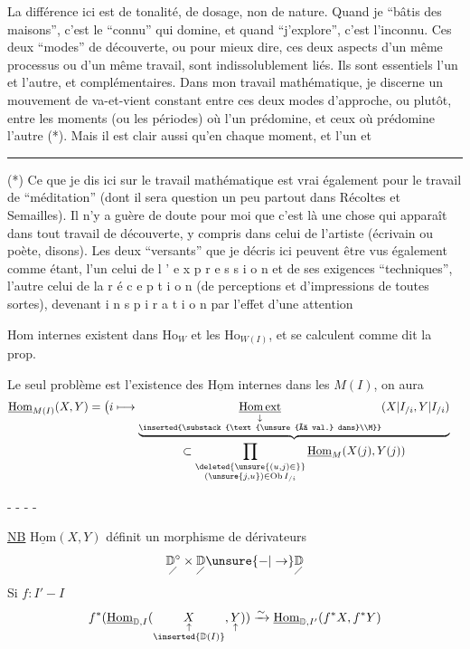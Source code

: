 La différence ici est de tonalité, de dosage, non de nature. Quand je ``bâtis des maisons'', c'est le ``connu'' qui domine, et quand ``j'explore'', c'est l'inconnu. Ces deux ``modes'' de découverte, ou pour mieux dire, ces deux aspects d'un même processus ou d'un même travail, sont indissolublement liés. Ils sont essentiels l'un et l'autre, et complémentaires. Dans mon travail mathématique, je discerne un mouvement de va-et-vient constant entre ces deux modes d'approche, ou plutôt, entre les moments (ou les périodes) où l'un prédomine, et ceux où prédomine l'autre (*). Mais il est clair aussi qu'en chaque moment, et l'un et

\noindent\rule{2.1cm}{0.4pt}

(*) Ce que je dis ici sur le travail mathématique est vrai également pour le travail de ``méditation'' (dont il sera question un peu partout dans Récoltes et Semailles). Il n'y a guère de doute pour moi que c'est là une chose qui apparaît dans tout travail de découverte, y compris dans celui de l'artiste (écrivain ou poète, disons). Les deux ``versants'' que je décris ici peuvent être vus également comme étant, l'un celui de l ' e x p r e s s i o n et de ses exigences ``techniques'', l'autre celui de la r é c e p t i o n (de perceptions et d'impressions de toutes sortes), devenant i n s p i r a t i o n par l'effet d'une attention

$\mathrm{Hom}$ internes existent dans  $\mathrm{Ho}_W$ et les $\mathrm{Ho}_{W(I)}$, et se calculent comme dit  la prop.

Le seul problème est l'existence des $\underline{\mathrm{Hom}}$ internes dans les $M(I)$, on aura
\[
\begin{aligned}
\underline{\mathrm{Hom}}_{M(I)}(X,Y)
 &=\bigl(i\longmapsto
 \underbrace{\underset{\substack{\downarrow\\\inserted{\substack{\text{\unsure{à val.} dans}\\M}}}}{\underline{\mathrm{Hom}\,\mathrm{ext}}}
 (X\vert I_{/i},Y\vert I_{/i})}_{\displaystyle
 \subset\prod_{\substack{\deleted{\unsure{(u,j)\in}}\\(\unsure{j,u})\in\mathrm{Ob}\,I_{/i}}}\underline{\mathrm{Hom}}_M(X(j),Y(j))}
\end{aligned}
\]

- - - -

\uline{NB}  $\underline{\mathrm{Hom}}(X,Y)$ définit un morphisme de dérivateurs
\[
\underset{\diagup}{\mathbb{D}^{\circ}}\times\underset{\diagup}{\mathbb{D}}\unsure{-|\to}\underset{\diagup}{\mathbb{D}}
\]
Si $f:I'-I$
\[
 f^*(\underline{\mathrm{Hom}}_{\mathbb{D},I}
 (\underset{\substack{\uparrow\\\inserted{\mathbb{D}(I)}}}{X},\underset{\uparrow}{Y}))
 \xrightarrow{\sim}\underline{\mathrm{Hom}}_{\mathbb{D},I'}(f^*X,f^*Y)
\]

